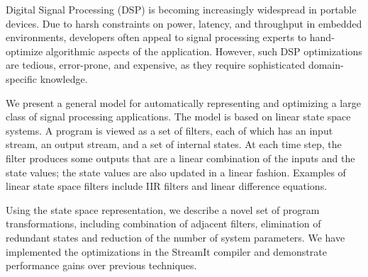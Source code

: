 Digital Signal Processing (DSP) is becoming increasingly wide\-spread
in portable devices. Due to harsh constraints on power, latency, and
throughput in embedded environments, developers often appeal to signal
processing experts to hand-optimize algorithmic aspects of the
application.  However, such DSP optimizations are tedious,
error-prone, and expensive, as they require sophisticated
domain-specific knowledge.

We present a general model for automatically representing and
optimizing a large class of signal processing applications. The model
is based on linear state space systems. A program is viewed as a set
of filters, each of which has an input stream, an output stream, and a
set of internal states. At each time step, the filter produces some
outputs that are a linear combination of the inputs and the state
values; the state values are also updated in a linear
fashion. Examples of linear state space filters include IIR filters
and linear difference equations.

Using the state space representation, we describe a novel set of
program transformations, including combination of adjacent filters,
elimination of redundant states and reduction of the number of system
parameters. We have implemented the optimizations in the StreamIt
compiler and demonstrate performance gains over previous techniques.
